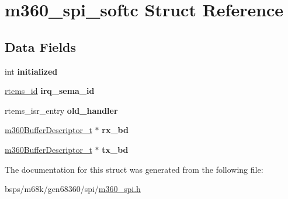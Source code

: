 \hypertarget{structm360__spi__softc}{}\section{m360\+\_\+spi\+\_\+softc Struct Reference}
\label{structm360__spi__softc}
\subsection*{Data Fields}
\begin{DoxyCompactItemize}
\item 
\mbox{\label{structm360__spi__softc_a18857992157ebf0f87f7a3492d3f1ced}} 
int {\bfseries initialized}
\item 
\mbox{\label{structm360__spi__softc_a46af9cb88bcac379872cb9cca0f8e532}} 
\mbox{\hyperlink{group__ClassicTasks_gab20892b814dced7dd4e5b9bf42becd57}{rtems\+\_\+id}} {\bfseries irq\+\_\+sema\+\_\+id}
\item 
\mbox{\label{structm360__spi__softc_af0ceb523e0ba96e7740445bccfa2eb99}} 
rtems\+\_\+isr\+\_\+entry {\bfseries old\+\_\+handler}
\item 
\mbox{\label{structm360__spi__softc_aca0e680222e83b65180701e420d9836d}} 
\mbox{\hyperlink{structm360BufferDescriptor__}{m360\+Buffer\+Descriptor\+\_\+t}} $\ast$ {\bfseries rx\+\_\+bd}
\item 
\mbox{\label{structm360__spi__softc_a11dde76bfc9e12a93aec348bd76f8f2d}} 
\mbox{\hyperlink{structm360BufferDescriptor__}{m360\+Buffer\+Descriptor\+\_\+t}} $\ast$ {\bfseries tx\+\_\+bd}
\end{DoxyCompactItemize}


The documentation for this struct was generated from the following file\+:\begin{DoxyCompactItemize}
\item 
bsps/m68k/gen68360/spi/\mbox{\hyperlink{m360__spi_8h}{m360\+\_\+spi.\+h}}\end{DoxyCompactItemize}
